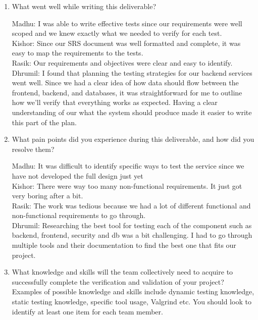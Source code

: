 \documentclass[12pt, titlepage]{article}
\begin{document}
\begin{enumerate}
  \item What went well while writing this deliverable? 
  
  Madhu: I was able to write effective tests since our requirements were well scoped and we knew exactly what we needed to verify for each test.\\
  Kishor: Since our SRS document was well formatted and complete, it was easy to map the requirements to the tests.\\
  Rasik: Our requirements and objectives were clear and easy to identify. \\
  Dhrumil: I found that planning the testing strategies for our backend services went well. Since we had a clear idea of how data should flow between the frontend, backend, and databases, it was straightforward for me to outline how we'll verify that everything works as expected. Having a clear understanding of our what the system should produce made it easier to write this part of the plan.\\

  \item What pain points did you experience during this deliverable, and how
    did you resolve them?

  Madhu: It was difficult to identify specific ways to test the service since we have not developed the full design just yet\\
  Kishor: There were way too many non-functional requirements. It just got very boring after a bit.\\
  Rasik: The work was tedious because we had a lot of different functional and non-functional requirements to go through.\\
  Dhrumil: Researching the best tool for testing each of the component such as backend, frontend, security and db was a bit challenging. I had to go through multiple tools and their documentation to find the best one that fits our project.\\

  \item What knowledge and skills will the team collectively need to acquire to
  successfully complete the verification and validation of your project?
  Examples of possible knowledge and skills include dynamic testing knowledge,
  static testing knowledge, specific tool usage, Valgrind etc.  You should look to
  identify at least one item for each team member.


\end{enumerate}
\end{document}
